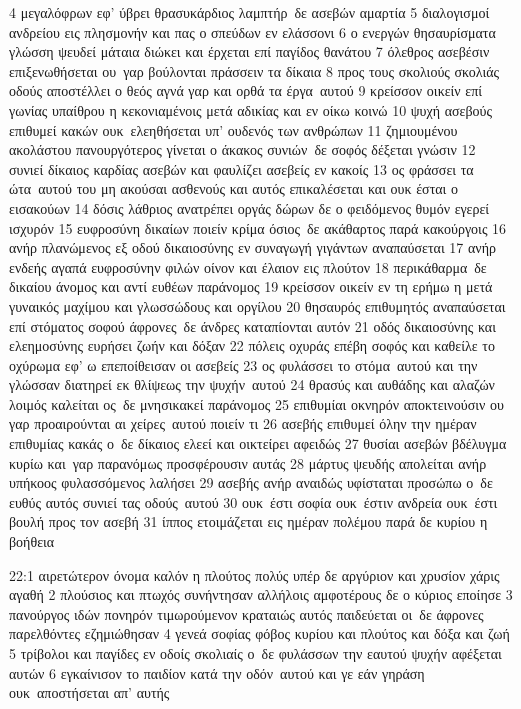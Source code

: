 \documentclass[10pt,oneside,footinclude=true,headinclude=true]{scrbook} %
\begin{document}
4 μεγαλόφρων εφ' ύβρει θρασυκάρδιος λαμπτήρ δε ασεβών αμαρτία
5 διαλογισμοί ανδρείου εις πλησμονήν και πας ο σπεύδων εν ελάσσονι
6 ο ενεργών θησαυρίσματα γλώσση ψευδεί μάταια διώκει και έρχεται επί παγίδος θανάτου
7 όλεθρος ασεβέσιν επιξενωθήσεται ου γαρ βούλονται πράσσειν τα δίκαια
8 προς τους σκολιούς σκολιάς οδούς αποστέλλει ο θεός αγνά γαρ και ορθά τα έργα αυτού
9 κρείσσον οικείν επί γωνίας υπαίθρου η κεκονιαμένοις μετά αδικίας και εν οίκω κοινώ
10 ψυχή ασεβούς επιθυμεί κακών ουκ ελεηθήσεται υπ' ουδενός των ανθρώπων
11 ζημιουμένου ακολάστου πανουργότερος γίνεται ο άκακος συνιών δε σοφός δέξεται γνώσιν
12 συνιεί δίκαιος καρδίας ασεβών και φαυλίζει ασεβείς εν κακοίς
13 ος φράσσει τα ώτα αυτού του μη ακούσαι ασθενούς και αυτός επικαλέσεται και ουκ έσται ο εισακούων
14 δόσις λάθριος ανατρέπει οργάς δώρων δε ο φειδόμενος θυμόν εγερεί ισχυρόν
15 ευφροσύνη δικαίων ποιείν κρίμα όσιος δε ακάθαρτος παρά κακούργοις
16 ανήρ πλανώμενος εξ οδού δικαιοσύνης εν συναγωγή γιγάντων αναπαύσεται
17 ανήρ ενδεής αγαπά ευφροσύνην φιλών οίνον και έλαιον εις πλούτον
18 περικάθαρμα δε δικαίου άνομος και αντί ευθέων παράνομος
19 κρείσσον οικείν εν τη ερήμω η μετά γυναικός μαχίμου και γλωσσώδους και οργίλου
20 θησαυρός επιθυμητός αναπαύσεται επί στόματος σοφού άφρονες δε άνδρες καταπίονται αυτόν
21 οδός δικαιοσύνης και ελεημοσύνης ευρήσει ζωήν και δόξαν
22 πόλεις οχυράς επέβη σοφός και καθείλε το οχύρωμα εφ' ω επεποίθεισαν οι ασεβείς
23 ος φυλάσσει το στόμα αυτού και την γλώσσαν διατηρεί εκ θλίψεως την ψυχήν αυτού
24 θρασύς και αυθάδης και αλαζών λοιμός καλείται ος δε μνησικακεί παράνομος
25 επιθυμίαι οκνηρόν αποκτεινούσιν ου γαρ προαιρούνται αι χείρες αυτού ποιείν τι
26 ασεβής επιθυμεί όλην την ημέραν επιθυμίας κακάς ο δε δίκαιος ελεεί και οικτείρει αφειδώς
27 θυσίαι ασεβών βδέλυγμα κυρίω και γαρ παρανόμως προσφέρουσιν αυτάς
28 μάρτυς ψευδής απολείται ανήρ υπήκοος φυλασσόμενος λαλήσει
29 ασεβής ανήρ αναιδώς υφίσταται προσώπω ο δε ευθύς αυτός συνιεί τας οδούς αυτού
30 ουκ έστι σοφία ουκ έστιν ανδρεία ουκ έστι βουλή προς τον ασεβή
31 ίππος ετοιμάζεται εις ημέραν πολέμου παρά δε κυρίου η βοήθεια
\par
22:1 αιρετώτερον όνομα καλόν η πλούτος πολύς υπέρ δε αργύριον και χρυσίον χάρις αγαθή
2 πλούσιος και πτωχός συνήντησαν αλλήλοις αμφοτέρους δε ο κύριος εποίησε
3 πανούργος ιδών πονηρόν τιμωρούμενον κραταιώς αυτός παιδεύεται οι δε άφρονες παρελθόντες εζημιώθησαν
4 γενεά σοφίας φόβος κυρίου και πλούτος και δόξα και ζωή
5 τρίβολοι και παγίδες εν οδοίς σκολιαίς ο δε φυλάσσων την εαυτού ψυχήν αφέξεται αυτών
6 εγκαίνισον το παιδίον κατά την οδόν αυτού και γε εάν γηράση ουκ αποστήσεται απ' αυτής
\end{document}
